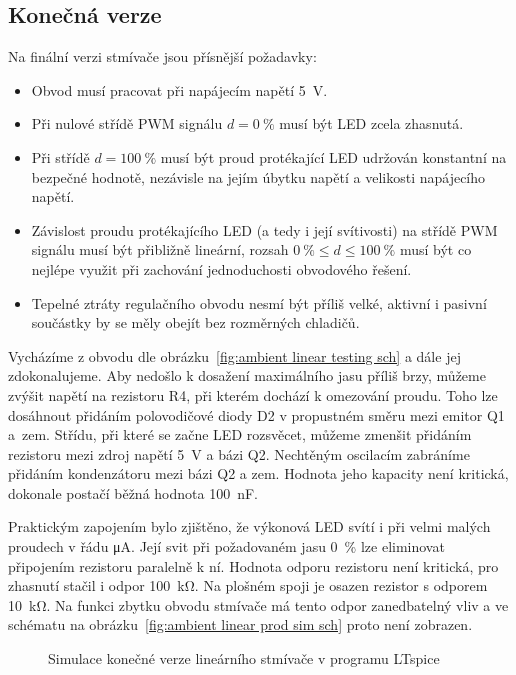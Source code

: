 \subsection{Konečná verze}
Na finální verzi stmívače jsou přísnější požadavky:
\begin{itemize}
    \item Obvod musí pracovat při napájecím napětí \SI{5}{\volt}.
    \item Při nulové střídě PWM signálu $d = \SI{0}{\percent}$ musí být LED
        zcela zhasnutá.
    \item Při střídě $d = \SI{100}{\percent}$ musí být proud protékající LED
        udržován konstantní na bezpečné hodnotě, nezávisle na jejím úbytku
        napětí a velikosti napájecího napětí.
    \item Závislost proudu protékajícího LED (a tedy i její svítivosti) na
        střídě PWM signálu musí být přibližně lineární, rozsah
        $\SI{0}{\percent} \le d \le \SI{100}{\percent}$ musí být co nejlépe
        využit při zachování jednoduchosti obvodového řešení.
    \item Tepelné ztráty regulačního obvodu nesmí být příliš velké, aktivní
        i pasivní součástky by se měly obejít bez rozměrných chladičů.
\end{itemize}

Vycházíme z obvodu dle obrázku~\vref{fig:ambient linear testing sch} a dále jej
zdokonalujeme. Aby nedošlo k dosažení maximálního jasu příliš brzy, můžeme
zvýšit napětí na rezistoru R4, při kterém dochází k omezování proudu. Toho lze
dosáhnout přidáním polovodičové diody D2 v propustném směru mezi emitor Q1
a~zem. Střídu, při které se začne LED rozsvěcet, můžeme zmenšit přidáním
rezistoru mezi zdroj napětí \SI{5}{\volt} a bázi Q2. Nechtěným oscilacím
zabráníme přidáním kondenzátoru mezi bázi Q2 a zem. Hodnota jeho kapacity není
kritická, dokonale postačí běžná hodnota \SI{100}{\nano\farad}.

Praktickým zapojením bylo zjištěno, že výkonová LED svítí i při velmi malých
proudech v řádu \si{\micro\ampere}. Její svit při požadovaném jasu
\SI{0}{\percent} lze eliminovat připojením rezistoru paralelně k ní. Hodnota
odporu rezistoru není kritická, pro zhasnutí stačil i odpor
\SI{100}{\kilo\ohm}. Na plošném spoji je osazen rezistor s odporem
\SI{10}{\kilo\ohm}. Na funkci zbytku obvodu stmívače má tento odpor
zanedbatelný vliv a ve schématu na
obrázku~\vref{fig:ambient linear prod sim sch} proto není zobrazen.

\begin{figure}
    \centering
    \caption{Simulace konečné verze lineárního stmívače v programu LTspice}
    \label{fig:ambient linear prod sim}
\end{figure}

